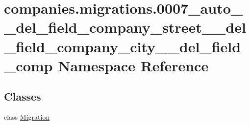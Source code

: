 \hypertarget{namespacecompanies_1_1migrations_1_10007__auto____del__field__company__street____del__field__company__city____del__field__comp}{\section{companies.\-migrations.0007\-\_\-auto\-\_\-\-\_\-del\-\_\-field\-\_\-company\-\_\-street\-\_\-\-\_\-del\-\_\-field\-\_\-company\-\_\-city\-\_\-\-\_\-del\-\_\-field\-\_\-comp Namespace Reference}
\label{namespacecompanies_1_1migrations_1_10007__auto____del__field__company__street____del__field__company__city____del__field__comp}
}
\subsection*{Classes}
\begin{DoxyCompactItemize}
\item 
class \hyperlink{classcompanies_1_1migrations_1_10007__auto____del__field__company__street____del__field__company22fc2f9c6f942cc3a3eb71c9155c8d7d}{Migration}
\end{DoxyCompactItemize}
